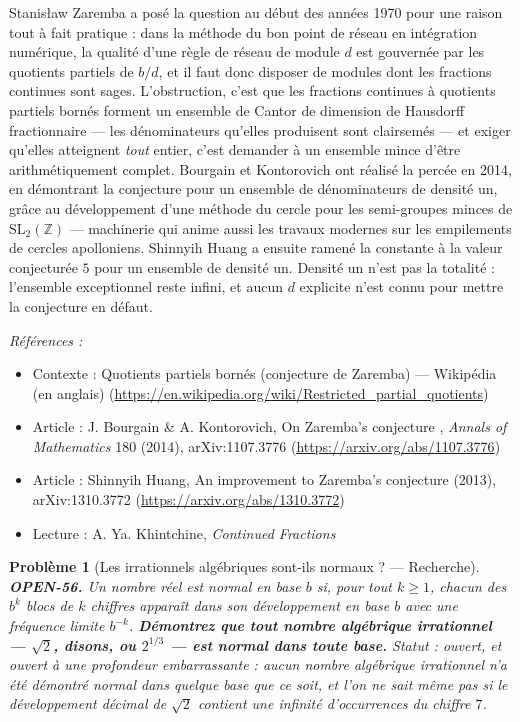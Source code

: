 \documentclass[11pt]{article}
\newtheorem{problem}{Problème}
\newenvironment{refs}{\par\small\noindent\emph{Références :}\begin{itemize}\setlength\itemsep{0pt}}{\end{itemize}\normalsize}
\begin{document}
\noindent Stanis\l{}aw Zaremba a posé la question au début des années 1970 pour une
raison tout à fait pratique : dans la méthode du \og{} bon point de réseau \fg{} en intégration
numérique, la qualité d'une règle de réseau de module $ d $ est gouvernée par les
quotients partiels de $ b/d $, et il faut donc disposer de modules dont les fractions
continues sont sages. L'obstruction, c'est que les fractions continues à quotients partiels
bornés forment un ensemble de Cantor de dimension de Hausdorff fractionnaire --- les
dénominateurs qu'elles produisent sont clairsemés --- et exiger qu'elles atteignent
\textit{tout} entier, c'est demander à un ensemble mince d'être arithmétiquement complet.
Bourgain et Kontorovich ont réalisé la percée en 2014, en démontrant la conjecture pour un
ensemble de dénominateurs de densité un, grâce au développement d'une méthode du cercle
pour les semi-groupes minces de $ \mathrm{SL}_2(\mathbb{Z}) $ --- machinerie qui anime aussi
les travaux modernes sur les empilements de cercles apolloniens. Shinnyih Huang a ensuite
ramené la constante à la valeur conjecturée $ 5 $ pour un ensemble de densité un. Densité
un n'est pas la totalité : l'ensemble exceptionnel reste infini, et aucun $ d $ explicite
n'est connu pour mettre la conjecture en défaut.

\begin{refs}
\item Contexte : Quotients partiels bornés (conjecture de Zaremba) --- Wikipédia (en anglais) (\url{https://en.wikipedia.org/wiki/Restricted_partial_quotients})
\item Article : J. Bourgain \& A. Kontorovich, \og{} On Zaremba's conjecture \fg{}, \textit{Annals of Mathematics} 180 (2014), arXiv:1107.3776 (\url{https://arxiv.org/abs/1107.3776})
\item Article : Shinnyih Huang, \og{} An improvement to Zaremba's conjecture \fg{} (2013), arXiv:1310.3772 (\url{https://arxiv.org/abs/1310.3772})
\item Lecture : A. Ya. Khintchine, \textit{Continued Fractions}
\end{refs}

\bigskip

\begin{problem}[{Les irrationnels algébriques sont-ils normaux ? --- Recherche}]
\textbf{OPEN-56.} Un nombre réel est \textit{normal} en base $ b $ si,
pour tout $ k \geq 1 $, chacun des $ b^{k} $ blocs de $ k $ chiffres apparaît dans
son développement en base $ b $ avec une fréquence limite $ b^{-k} $. \textbf{Démontrez que
tout nombre algébrique irrationnel --- $ \sqrt{2} $, disons, ou $ 2^{1/3} $ --- est normal
dans toute base.} Statut : ouvert, et ouvert à une profondeur embarrassante : aucun
nombre algébrique irrationnel n'a été démontré normal dans quelque base que ce soit, et
l'on ne sait même pas si le développement décimal de $ \sqrt{2} $ contient une infinité
d'occurrences du chiffre $ 7 $.
\end{problem}
\end{document}

